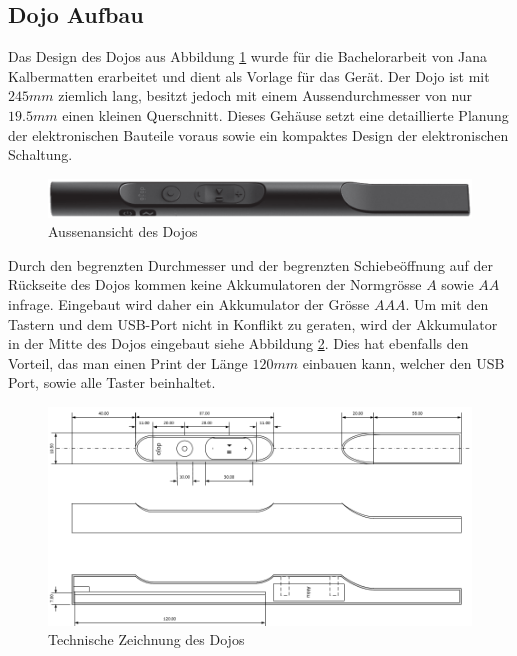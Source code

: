 \clearpage
\subsection{Dojo Aufbau}
Das Design des Dojos aus Abbildung \ref{fig:DojoBild} wurde für die Bachelorarbeit von Jana Kalbermatten erarbeitet und dient als Vorlage für das Gerät. Der Dojo ist mit $245mm$ ziemlich lang, besitzt jedoch mit einem Aussendurchmesser von nur $19.5mm$ einen kleinen Querschnitt. Dieses Gehäuse setzt eine detaillierte Planung der elektronischen Bauteile voraus sowie ein kompaktes Design der elektronischen Schaltung.



\begin{figure}[h]
	\centering
	\includegraphics[width=\textwidth]{graphics/DojoBild.png}
	\caption{Aussenansicht des Dojos}
	\label{fig:DojoBild}
\end{figure}

Durch den begrenzten Durchmesser und der begrenzten Schiebeöffnung auf der Rückseite des Dojos kommen keine Akkumulatoren der Normgrösse $A$ sowie $AA$ infrage. Eingebaut wird daher ein Akkumulator der Grösse $AAA$. Um mit den Tastern und dem USB-Port nicht in Konflikt zu geraten, wird der Akkumulator in der Mitte des Dojos eingebaut siehe Abbildung \ref{fig:DojoQuerschnitt}. Dies hat ebenfalls den Vorteil, das man einen Print der Länge $120mm$ einbauen kann, welcher den USB Port, sowie alle Taster beinhaltet.


\begin{figure}[h]
	\centering
	\includegraphics[width=\textwidth]{graphics/DojoQuerschnitt.png}
	\caption{Technische Zeichnung des Dojos}
	\label{fig:DojoQuerschnitt}
\end{figure}

